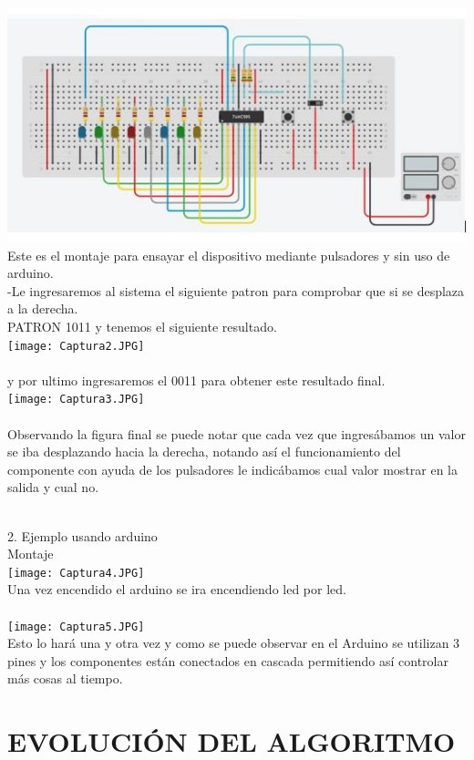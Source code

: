 \documentclass{article}
\begin{document}
\includegraphics{Captura1.JPG}\\
Este es el montaje para ensayar el dispositivo mediante pulsadores y sin uso de arduino.\\

-Le ingresaremos al sistema el siguiente patron para comprobar que si se desplaza a la derecha.\\
PATRON 1011 y tenemos el siguiente resultado.\\
\texttt{[image: Captura2.JPG]}\\
\\
y por ultimo ingresaremos el 0011 para obtener este resultado final.\\
\texttt{[image: Captura3.JPG]}\\
\\
Observando la figura final se puede notar que cada vez que ingresábamos un valor se iba desplazando hacia la derecha, notando así el funcionamiento del componente con ayuda de los pulsadores le indicábamos cual valor mostrar en la salida y cual no.\\
\\
\item 2. Ejemplo usando arduino\\
Montaje\\
\texttt{[image: Captura4.JPG]}\\
Una vez encendido el arduino se ira encendiendo led por led.\\
\\
\texttt{[image: Captura5.JPG]}\\
Esto lo hará una y otra vez y como se puede observar en el Arduino se utilizan 3 pines y los componentes están conectados en cascada permitiendo así controlar más cosas al tiempo.\\



\newpage
\section{EVOLUCIÓN DEL ALGORITMO}
\label{evolucion}
\end{document}
